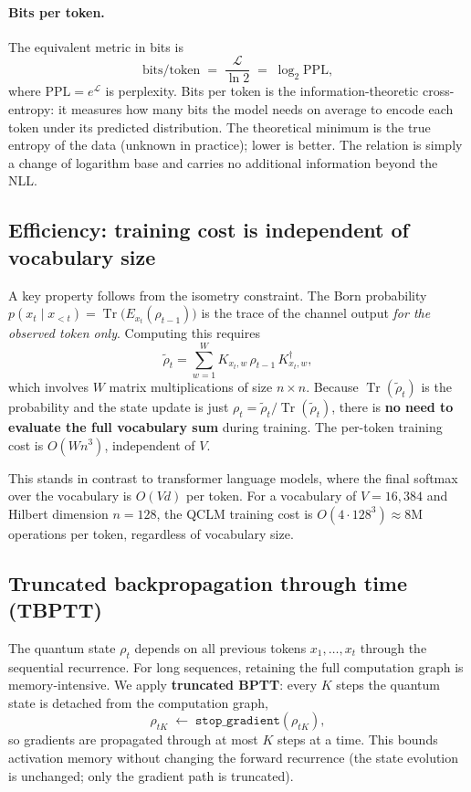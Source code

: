 \documentclass[11pt,a4paper]{article}
\newcommand{\Tr}{\operatorname{Tr}}
\newcommand{\Kx}[2]{K_{#1,#2}}     %
\newcommand{\Ex}[1]{E_{#1}}         %
\theoremstyle{plain}
\begin{document}
\paragraph{Bits per token.}
The equivalent metric in bits is
\begin{equation}\label{eq:bits}
  \text{bits/token} \;=\; \frac{\mathcal{L}}{\ln 2}
  \;=\; \log_2 \mathrm{PPL},
\end{equation}
where $\mathrm{PPL} = e^{\mathcal{L}}$ is perplexity. Bits per
token is the information-theoretic cross-entropy: it measures how many
bits the model needs on average to encode each token under its predicted
distribution. The theoretical minimum is the true entropy of the data
(unknown in practice); lower is better. The relation is simply a change
of logarithm base and carries no additional information beyond the NLL.

\subsection{Efficiency: training cost is independent of vocabulary size}

A key property follows from the isometry constraint. The Born
probability $p(x_t\mid x_{<t}) = \Tr\bigl(\Ex{x_t}(\rho_{t-1})\bigr)$
is the trace of the channel output \emph{for the observed token only}.
Computing this requires
\[
  \tilde\rho_t = \sum_{w=1}^W \Kx{x_t}{w}\,\rho_{t-1}\,\Kx{x_t}{w}^\dagger,
\]
which involves $W$ matrix multiplications of size $n\times n$. Because
$\Tr(\tilde\rho_t)$ is the probability and the state update is just
$\rho_t = \tilde\rho_t / \Tr(\tilde\rho_t)$, there is \textbf{no
need to evaluate the full vocabulary sum} during training. The per-token
training cost is $O(W n^3)$, independent of $V$.

This stands in contrast to transformer language models, where the final
softmax over the vocabulary is $O(V d)$ per token. For a vocabulary of
$V = 16{,}384$ and Hilbert dimension $n = 128$, the QCLM training cost
is $O(4 \cdot 128^3) \approx 8\text{M}$ operations per token, regardless
of vocabulary size.

\subsection{Truncated backpropagation through time (TBPTT)}

The quantum state $\rho_t$ depends on all previous tokens
$x_1,\ldots,x_t$ through the sequential recurrence. For long sequences,
retaining the full computation graph is memory-intensive. We apply
\textbf{truncated BPTT}: every $K$ steps the quantum state is detached
from the computation graph,
\[
  \rho_{tK} \;\leftarrow\; \texttt{stop\_gradient}(\rho_{tK}),
\]
so gradients are propagated through at most $K$ steps at a time.
This bounds activation memory without changing the forward recurrence
(the state evolution is unchanged; only the gradient path is truncated).
\end{document}
